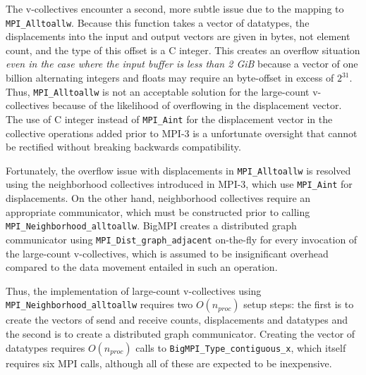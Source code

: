 The v-collectives encounter a second, more subtle issue due to the mapping to
\texttt{MPI\_Alltoallw}.  Because this function takes a vector of datatypes, the
displacements into the input and output vectors are given in bytes,
not element count, and the type of this offset is a C integer.
This creates an overflow situation \textit{even in the case
where the input buffer is less than 2 GiB} because a vector of one billion
alternating integers and floats may require an byte-offset in excess of $2^{31}$.
Thus, \texttt{MPI\_Alltoallw} is not an acceptable solution for the large-count
v-collectives because of the likelihood of overflowing in the displacement vector.
The use of C integer instead of \texttt{MPI\_Aint} for the displacement vector in
the  collective operations added prior to MPI-3 is a unfortunate oversight that
cannot be rectified without breaking backwards compatibility.


Fortunately, the overflow issue with displacements in \texttt{MPI\_Alltoallw} is
resolved using the neighborhood collectives introduced in MPI-3, which
use \texttt{MPI\_Aint} for displacements.
On the other hand, neighborhood collectives require an appropriate
communicator, which must be constructed prior to calling \texttt{MPI\_Neighborhood\_alltoallw}.
BigMPI creates a distributed graph communicator using \texttt{MPI\_Dist\_graph\_adjacent}
on-the-fly for every invocation of the large-count v-collectives, which is assumed to be
insignificant overhead compared to the data movement entailed in such an operation.

Thus, the implementation of large-count v-collectives using \texttt{MPI\_Neighborhood\_alltoallw} 
requires two $O(n_{proc})$ setup steps: the first is to create the vectors of send and receive
counts, displacements and datatypes and the second is to create a distributed graph communicator.
Creating the vector of datatypes requires $O(n_{proc})$ calls to \texttt{BigMPI\_Type\_contiguous\_x},
which itself requires six MPI calls, although all of these are expected to be inexpensive.


